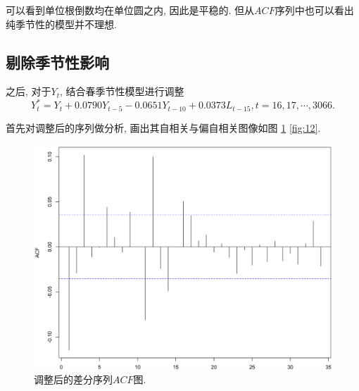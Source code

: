 \documentclass[12pt]{article}
\begin{document}
\qquad 可以看到单位根倒数均在单位圆之内, 因此是平稳的. 但从$ACF$序列中也可以看出纯季节性的模型并不理想. 
\subsection{剔除季节性影响}








\qquad 之后, 对于$Y_t$, 结合春季节性模型进行调整
\[
    Y_t^*=Y_t+0.0790Y_{t-5}-0.0651Y_{t-10}+0.0373L_{t-15}, t=16,17,\cdots,3066.
\]

首先对调整后的序列做分析, 画出其自相关与偏自相关图像如图 \ref{fig:11} \ref{fig:12}. 

\begin{center}
    \hspace{30pt}\begin{minipage}{0.45\textwidth}
        \begin{figure}
            \centering
            \hspace{-25pt}\includegraphics[width=.95\textwidth]{acf2}
            \caption{调整后的差分序列$ACF$图.\label{fig:11}}
        \end{figure}
    \end{minipage}
    \begin{minipage}{0.45\textwidth}
        \begin{figure}
            \centering

\end{figure}
\end{minipage}
\end{center}
\end{document}

